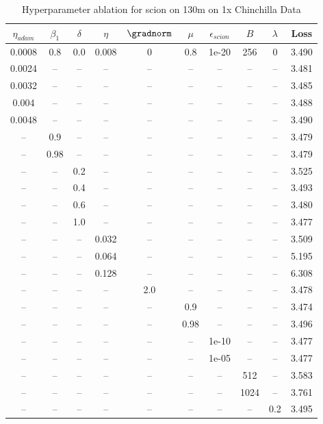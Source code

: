 \begin{table}[h!]
\centering
\caption{Hyperparameter ablation for scion on 130m on 1x Chinchilla Data}
\label{tab:ablation_scion_130m_on_1x_chinchilla_data}
\begin{tabular}{cccccccccc}
\toprule
$\eta_{adam}$ & $\beta_1$ & $\delta$ & $\eta$ & $\gradnorm$ & $\mu$ & $\epsilon_{scion}$ & $B$ & $\lambda$ & Loss \\
\midrule
0.0008 & 0.8 & 0.0 & 0.008 & 0 & 0.8 & 1e-20 & 256 & 0 & 3.490 \\
\midrule
0.0024 & -- & -- & -- & -- & -- & -- & -- & -- & 3.481 \\
0.0032 & -- & -- & -- & -- & -- & -- & -- & -- & 3.485 \\
0.004 & -- & -- & -- & -- & -- & -- & -- & -- & 3.488 \\
0.0048 & -- & -- & -- & -- & -- & -- & -- & -- & 3.490 \\
-- & 0.9 & -- & -- & -- & -- & -- & -- & -- & 3.479 \\
-- & 0.98 & -- & -- & -- & -- & -- & -- & -- & 3.479 \\
-- & -- & 0.2 & -- & -- & -- & -- & -- & -- & 3.525 \\
-- & -- & 0.4 & -- & -- & -- & -- & -- & -- & 3.493 \\
-- & -- & 0.6 & -- & -- & -- & -- & -- & -- & 3.480 \\
-- & -- & 1.0 & -- & -- & -- & -- & -- & -- & 3.477 \\
-- & -- & -- & 0.032 & -- & -- & -- & -- & -- & 3.509 \\
-- & -- & -- & 0.064 & -- & -- & -- & -- & -- & 5.195 \\
-- & -- & -- & 0.128 & -- & -- & -- & -- & -- & 6.308 \\
-- & -- & -- & -- & 2.0 & -- & -- & -- & -- & 3.478 \\
-- & -- & -- & -- & -- & 0.9 & -- & -- & -- & 3.474 \\
-- & -- & -- & -- & -- & 0.98 & -- & -- & -- & 3.496 \\
-- & -- & -- & -- & -- & -- & 1e-10 & -- & -- & 3.477 \\
-- & -- & -- & -- & -- & -- & 1e-05 & -- & -- & 3.477 \\
-- & -- & -- & -- & -- & -- & -- & 512 & -- & 3.583 \\
-- & -- & -- & -- & -- & -- & -- & 1024 & -- & 3.761 \\
-- & -- & -- & -- & -- & -- & -- & -- & 0.2 & 3.495 \\
\bottomrule
\end{tabular}
\end{table}


